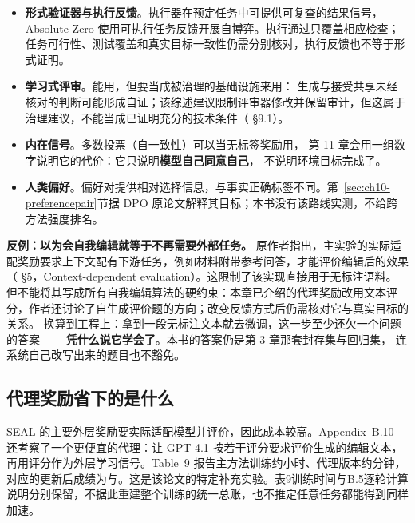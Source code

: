 \begin{itemize}
  \item \textbf{形式验证器与执行反馈}。执行器在预定任务中可提供可复查的结果信号，Absolute Zero 使用可执行任务反馈开展自博弈\cite{absolute-zero-2505}。执行通过只覆盖相应检查；任务可行性、测试覆盖和真实目标一致性仍需分别核对，执行反馈也不等于形式证明。
  \item \textbf{学习式评审}。能用，但要当成被治理的基础设施来用：
        生成与接受共享未经核对的判断可能形成自证；该综述建议限制评审器修改并保留审计，但这属于治理建议，不能当成已证明充分的技术条件（\cite{self-improvements-survey-2607} §9.1）。
  \item \textbf{内在信号}。多数投票（自一致性）可以当无标签奖励用，
        第 11 章会用一组数字说明它的代价：它只说明\textbf{模型自己同意自己}，
        不说明环境目标完成了。
  \item \textbf{人类偏好}。偏好对提供相对选择信息，与事实正确标签不同。第~\ref{sec:ch10-preferencepair}节据 DPO 原论文解释其目标；本书没有该路线实测，不给跨方法强度排名。
\end{itemize}

\begin{pitfallbox}
\textbf{反例：以为\textbf{会自我编辑}就等于\textbf{不再需要外部任务}。}
原作者指出，主实验的实际适配奖励要求上下文配有下游任务，例如材料附带参考问答，才能评价编辑后的效果（\cite{seal-2506} §5，Context-dependent evaluation）。这限制了该实现直接用于无标注语料。
但不能将其写成所有自我编辑算法的硬约束：本章已介绍的代理奖励改用文本评分，作者还讨论了自生成评价题的方向；改变反馈方式后仍需核对它与真实目标的关系。
换算到工程上：拿到一段无标注文本就去微调，这一步至少还欠一个问题的答案——
\textbf{凭什么说它学会了}。本书的答案仍是第 3 章那套封存集与回归集，
连系统自己改写出来的题目也不豁免。
\end{pitfallbox}

\subsection{代理奖励省下的是什么}
\label{sec:ch10-proxyreward}

SEAL 的主要外层奖励要实际适配模型并评价，因此成本较高。Appendix~B.10 还考察了一个更便宜的代理：让 GPT-4.1 按若干评分要求评价生成的编辑文本，再用评分作为外层学习信号。Table~9 报告主方法训练约小时、代理版本约分钟，对应的更新后成绩为与\cite{seal-2506}。这是该论文的特定补充实验。表9训练时间与B.5逐轮计算说明分别保留，不据此重建整个训练的统一总账，也不推定任意任务都能得到同样加速。

